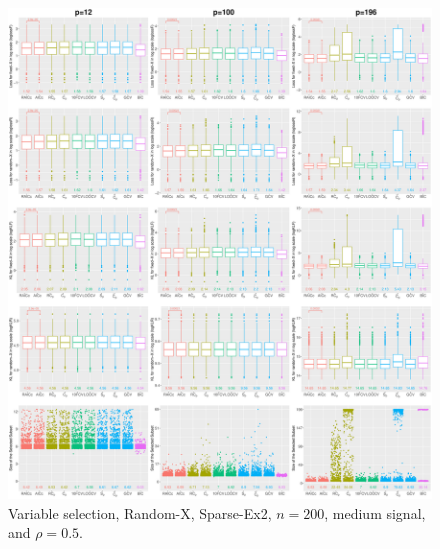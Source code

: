 \begin{figure}[!ht]
\centering
\includegraphics[width=\textwidth]{figures/supplement/randomx/subset_selection/Sparse-Ex2_n200_msnr_rho05.eps}
\caption{Variable selection, Random-X, Sparse-Ex2, $n=200$, medium signal, and $\rho=0.5$.}
\end{figure}
\clearpage

